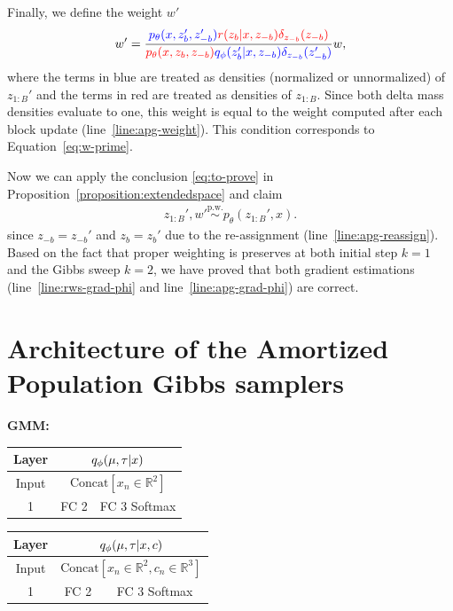 \documentclass{article}
\theoremstyle{definition}
\newcommand{\given}{\lvert}
\newcommand{\pw}{\overset{\text{p.w.}}{\sim}
}
\begin{document}
Finally, we define the weight $w'$
\begin{align}
    w' = \frac{{\color{blue}p_\theta(x, z_b', z_{-b}')} {\color{red}r(z_b \given x, z_{-b}) \delta_{z_{-b}}(z_{-b})}}{{\color{red}p_\theta(x, z_b, z_{-b})} {\color{blue}q_\phi(z_b' \given x, z_{-b}) \delta_{z_{-b}}(z_{-b}')}} w,
\end{align}
where the terms in blue are treated as densities (normalized or unnormalized) of $z_{1:B}'$ and the terms in red are treated as densities of $z_{1:B}$.
Since both delta mass densities evaluate to one, this weight is equal to the weight computed after each block update (line~\ref{line:apg-weight}). This condition corresponds to Equation~\ref{eq:w-prime}.

Now we can apply the conclusion \eqref{eq:to-prove} in Proposition~\ref{proposition:extendedspace} and claim 
\begin{align*}
z_{1:B}', w' \pw p_\theta(z_{1:B}', x)
.
\end{align*}
since $z_{-b} = z_{-b}'$ and $z_b = z_b'$ due to the re-assignment (line~\ref{line:apg-reassign}). Based on the fact that proper weighting is preserves at both initial step $k=1$ and the Gibbs sweep $k=2$, we have proved that both gradient estimations (line~\ref{line:rws-grad-phi} and line~\ref{line:apg-grad-phi}) are correct.

\section{Architecture of the Amortized Population Gibbs samplers}
\label{appendix:architecture}
\textbf{GMM:}

\begin{table}[h!]
    \centering
    \begin{tabular}{c|c|c}
    \toprule
     Layer 
     & 
    \multicolumn{2}{c}{$q_\phi(\mu, \tau | x)$}
    \\
    \midrule
    Input
    & 
    \multicolumn{2}{c}{$\mathrm{Concat}[x_n\in\mathbb{R}^2]$}
    \\
    \hline
    1
    & \parbox{3cm}{\centering FC 2}
    & \parbox{3cm}{\centering FC 3 Softmax}
    \\
    \bottomrule
    \end{tabular}
    \label{arch-gmm-rws}
\end{table}

\begin{table}[h!]
    \centering
    \begin{tabular}{c|c|c}
    \toprule
     Layer 
     & 
    \multicolumn{2}{c}{$q_\phi(\mu, \tau | x, c)$}
    \\
    \midrule
    Input
    & 
    \multicolumn{2}{c}{$\mathrm{Concat}[x_n\in\mathbb{R}^2, c_n\in\mathbb{R}^3]$}
    \\
    \hline
    1
    & \parbox{3cm}{\centering FC 2}
    & \parbox{3cm}{\centering FC 3 Softmax}
    \\
    \bottomrule
    \end{tabular}
    \label{arch-gmm-global}
\end{table}
\end{document}
